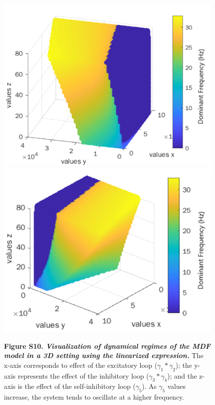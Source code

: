 \documentclass[12pt,twoside]{article}
\begin{document}
\begin{figure}[H]
    \centering
    \includegraphics[scale=0.6]{Images/3dmoran1.png}
    \includegraphics[scale=0.6]{Images/3dmoran2.png}
    \caption*{\textbf{Figure S10.  \textit{Visualization of dynamical regimes of the MDF model in a 3D setting using the linearized expression.}} The x-axis corresponds to effect of the excitatory loop ($\gamma_{1}*\gamma_{2}$); the y-axis represents the effect of the inhibitory loop ($\gamma_{3}*\gamma_{4}$); and the z-axis is the effect of the self-inhibitory loop ($\gamma_{5}$). As $\gamma_{5}$ values increase, the system tends to oscillate at a higher frequency.}
    \label{fig:3D_Moran}
\end{figure}
\end{document}
